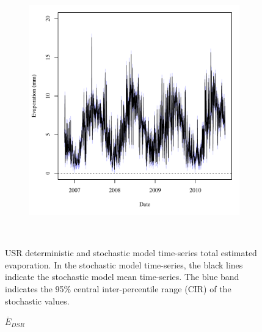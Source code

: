 \begin{linenumbers}
\begin{landscape}
\begin{figure}
\begin{subfigure}{0.7\textwidth}
			\includegraphics[width=\tableCustomSize]{"Figures/Results_USR/Stochastic/A Evap"}
		\end{subfigure}\\
		\caption[USR deterministic and stochastic model time-series total estimated evaporation.]{USR deterministic and stochastic model time-series total estimated evaporation.  In the stochastic model time-series, the black lines indicate the stochastic model mean time-series.  The blue band indicates the 95\% central inter-percentile range (CIR) of the stochastic values.}
		\label{fig:reachEvap_US}
	\end{figure}
\end{landscape}
\subfiguretop
\begin{landscape}
	\begin{figure}
		\centering
		$ \displaystyle \overline{E}_{DSR} $
		\begin{subfigure}{0.7\textwidth}
			\centering

\end{subfigure}
\end{figure}
\end{landscape}
\end{linenumbers}
